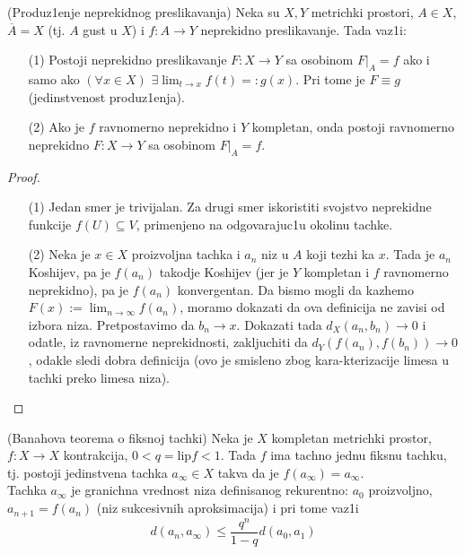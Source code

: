 \documentclass[a4paper,12pt]{article}
\newcommand{\psj}{\subseteq}
\begin{document}
\begin{tma}
(Produz1enje neprekidnog preslikavanja) Neka su $X, Y$ metrichki prostori, $A \in X$, $\overline{A} = X$ (tj. $A$ gust u $X$) i $f: A \to Y$ neprekidno preslikavanje. Tada vaz1i:
\begin{itemize}
\item[(1)] Postoji neprekidno preslikavanje $F: X \to Y$ sa osobinom $F|_{A} = f$ ako i samo ako $(\forall x \in X)$ $\exists \lim_{t \to x} f(t) =: g(x)$. Pri tome je $F \equiv g$ (jedinstvenost produz1enja).
\item[(2)] Ako je $f$ ravnomerno neprekidno i $Y$ kompletan, onda postoji ravnomerno nepre\-kidno $F: X \to Y$ sa osobinom $F|_{A} = f$.
\end{itemize}
\end{tma}
\begin{proof}
\begin{itemize}
	\item[(1)] Jedan smer je trivijalan. Za drugi smer iskoristiti svojstvo neprekidne funkcije
		$f(U) \psj V$, primenjeno na odgovarajuc1u okolinu tachke.
\item[(2)] Neka je $x\in X$ proizvoljna tachka i $a_n$ niz u $A$ koji tezhi ka $x$. Tada je $a_n$ Koshijev, pa 
	je $f(a_n)$ takodje Koshijev (jer je $Y$ kompletan i $f$ ravnomerno neprekidno), pa je $f(a_n)$ konvergentan.
		Da bismo mogli da kazhemo $F(x):= \lim_{n\to\infty}f(a_n)$, moramo dokazati da ova definicija ne zavisi od izbora
		niza. Pretpostavimo da $b_n\to x$. Dokazati tada $d_X(a_n, b_n)\to 0$ i odatle, iz ravnomerne neprekidnosti, zakljuchiti
		da $d_Y(f(a_n), f(b_n))\to 0$, odakle sledi dobra definicija (ovo je smisleno zbog kara-kterizacije limesa u tachki preko 
		limesa niza).
\end{itemize}

\end{proof}

\begin{tma}
(Banahova teorema o fiksnoj tachki) Neka je $X$ kompletan metrichki prostor, $f: X \to X$ kontrakcija, $0 < q = \mathrm{lip} f < 1$. Tada $f$ ima tachno jednu fiksnu tachku, tj. postoji jedinstvena tachka $a_{\infty} \in X$ takva da je $f(a_{\infty}) = a_{\infty}$.\\
Tachka $a_{\infty}$ je granichna vrednost niza definisanog rekurentno: $a_0$ proizvoljno, $a_{n+1} = f(a_n)$ (niz sukcesivnih aproksimacija) i pri tome vaz1i \[d(a_n, a_{\infty}) \leq \frac{q^n}{1-q} d(a_0, a_1)\]
\end{tma}
\end{document}
